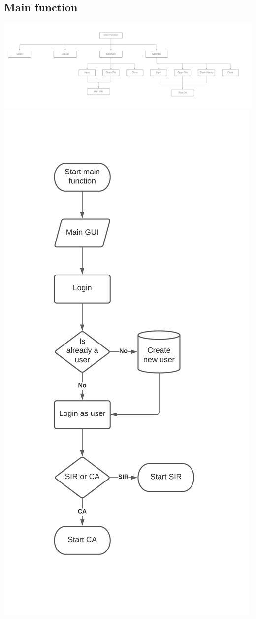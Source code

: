 \documentclass[11pt, a4paper]{article}
\begin{document}
\subsection{Main function}
\includegraphics[width=\textwidth, angle=90]{s_main_function.png}
\newpage
\includegraphics[width=\textwidth, height=\textheight]{f_main.png}
\newpage
\end{document}
